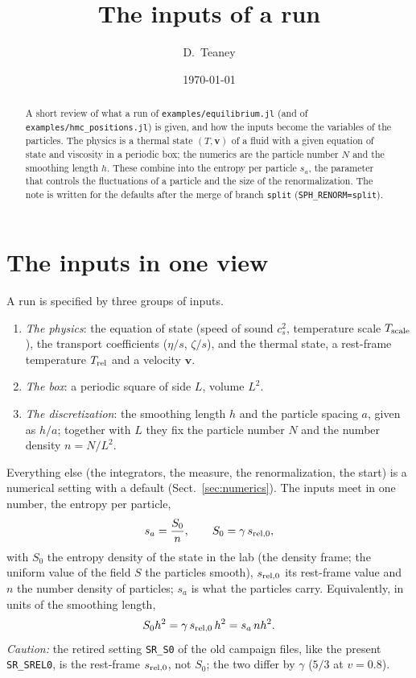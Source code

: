 \documentclass[11pt,aps,preprint,nofootinbib,superscriptaddress,tightenlines]{revtex4-2}
\def\st{\begin{equation}}
\def\stp{\end{equation}}
\def\Sect#1{Sect.~\ref{#1}}
\begin{document}
\sloppy

\title{The inputs of a run}
\author{D.~Teaney}
\date{\today}

\begin{abstract}
A short review of what a run of \texttt{examples/equilibrium.jl} (and of \texttt{examples/hmc\_positions.jl}) is given,
and how the inputs become the variables of the particles.  The physics is a thermal state $(T,\bm v)$ of a fluid with a given equation of
state and viscosity in a periodic box; the numerics are the particle number $N$ and the smoothing length $h$.  These combine into the
entropy per particle $s_a$, the parameter that controls the fluctuations of a particle and the size of the renormalization.  The note is
written for the defaults after the merge of branch \texttt{split} (\texttt{SPH\_RENORM=split}).
\end{abstract}

\maketitle

\section{The inputs in one view}
\label{sec:overview}

A run is specified by three groups of inputs.
\begin{enumerate}
\item \emph{The physics}: the equation of state (speed of sound $c_s^2$, temperature scale $T_{\rm scale}$), the transport coefficients
  ($\eta/s$, $\zeta/s$), and the thermal state, a rest-frame temperature $T_{\rm rel}$ and a velocity $\bm v$.
\item \emph{The box}: a periodic square of side $L$, volume $L^2$.
\item \emph{The discretization}: the smoothing length $h$ and the particle spacing $a$, given as $h/a$; together with $L$ they fix the
  particle number $N$ and the number density $n=N/L^2$.
\end{enumerate}
Everything else (the integrators, the measure, the renormalization, the start) is a numerical setting with a default (\Sect{sec:numerics}).
The inputs meet in one number, the entropy per particle,
\st
s_a=\frac{S_0}{n},\qquad S_0=\gamma\,s_{\rm rel,0},
\label{eq:sa}
\stp
with $S_0$ the entropy density of the state in the lab (the density frame; the uniform value of the field $S$ the particles smooth),
$s_{\rm rel,0}$ its rest-frame value and $n$
the number density of particles; $s_a$ is what the particles carry.  Equivalently, in units of the smoothing length,
\st
S_0h^2=\gamma\,s_{\rm rel,0}\,h^2=s_a\,nh^2 .
\label{eq:Sh2}
\stp
\emph{Caution:} the retired setting \texttt{SR\_S0} of the old campaign files, like the present \texttt{SR\_SREL0}, is the rest-frame
$s_{\rm rel,0}$, not $S_0$; the two differ by $\gamma$ ($5/3$ at $v=0.8$).
\end{document}
